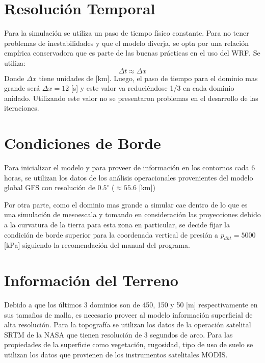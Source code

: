 \section{Resolución Temporal}
Para la simulación se utiliza un paso de tiempo físico constante. Para no tener problemas de inestabilidades y que el modelo diverja, se opta por una relación empírica conservadora que es parte de las buenas prácticas en el uso del WRF. Se utiliza:
\begin{equation}
\Delta t \approx \Delta x
\end{equation}
Donde $\Delta x$ tiene unidades de [km]. Luego, el paso de tiempo para el dominio mas grande será $\Delta x=12$ [s] y este valor va reduciéndose 1/3 en cada dominio anidado. Utilizando este valor no se presentaron problemas en el desarrollo de las iteraciones.
\section{Condiciones de Borde}
Para inicializar el modelo y para proveer de información en los contornos cada 6 horas, se utilizan los datos de los análisis operacionales provenientes del modelo global GFS con resolución de $0.5^\circ$ ($\approx 55.6$ [km])

Por otra parte, como el dominio mas grande a simular cae dentro de lo que es una simulación de mesoescala y tomando en consideración las proyecciones debido a la curvatura de la tierra para esta zona en particular, se decide fijar la condición de borde superior para la coordenada vertical de presión a $p_{dht} = 5000$ [kPa] siguiendo la recomendación del manual del programa.
\section{Información del Terreno}
Debido a que los últimos 3 dominios son de 450, 150 y 50 [m] respectivamente en sus tamaños de malla, es necesario proveer al modelo información superficial de alta resolución. Para la topografía se utilizan los datos de la operación satelital SRTM de la NASA que tienen resolución de 3 segundos de arco. Para las propiedades de la superficie como vegetación, rugosidad, tipo de uso de suelo se utilizan los datos que provienen de los instrumentos satelitales MODIS.
